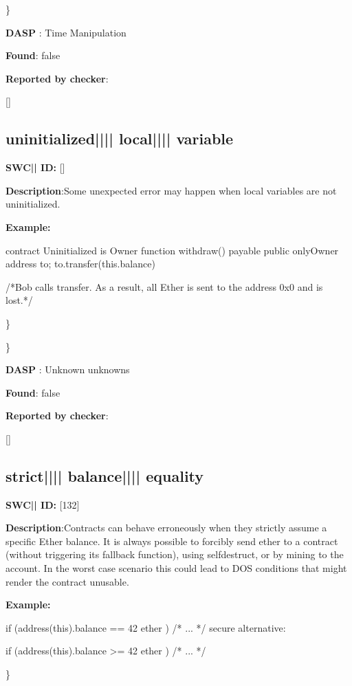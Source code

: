 \documentclass{article}
\begin{document}
\} 

\textbf{DASP} : Time Manipulation

\textbf{Found}: false

\textbf{Reported by checker}: 
\begin{ffcode} 

[]
\end{ffcode} 
\subsection{uninitialized{||\textunderscore|| }local{||\textunderscore|| }variable} 
\textbf{SWC{|\textunderscore| }ID:} []

\textbf{Description}:Some unexpected error may happen when local variables are not uninitialized.


\textbf{Example:} 
\begin{ffcode} 

contract Uninitialized is Owner{
    function withdraw() payable public onlyOwner{
        address to;
        to.transfer(this.balance)
    }
}

 /*Bob calls transfer. As a result, all Ether is sent to the address 0x0 and is lost.*/ 

\end{ffcode} 
\} 

\} 

\textbf{DASP} : Unknown unknowns

\textbf{Found}: false

\textbf{Reported by checker}: 
\begin{ffcode} 

[]
\end{ffcode} 
\subsection{strict{||\textunderscore|| }balance{||\textunderscore|| }equality} 
\textbf{SWC{|\textunderscore| }ID:} [132]

\textbf{Description}:Contracts can behave erroneously when they strictly assume a specific Ether balance. It is always possible to forcibly send ether to a contract (without triggering its fallback function), using selfdestruct, or by mining to the account. In the worst case scenario this could lead to DOS conditions that might render the contract unusable.


\textbf{Example:} 
\begin{ffcode} 

if (address(this).balance == 42 ether ) {
    /* ... */
}
 secure alternative:

if (address(this).balance >= 42 ether ) {
  /* ... */
}

\end{ffcode} 
\} 
\end{document}
